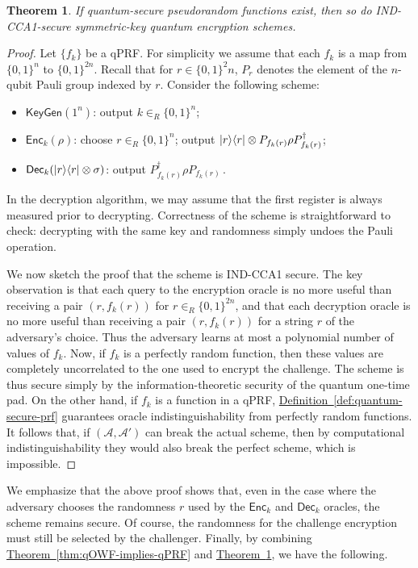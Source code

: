 \documentclass[11pt]{article}
\numberwithin{equation}{section}
\newtheorem{theorem}{Theorem}
\newcommand{\expref}[2]{\texorpdfstring{\hyperref[#2]{#1~\ref{#2}}}{#1~\ref{#2}}}
\newcommand{\algo}{\mathcal}
\newcommand{\KeyGen}{\ensuremath{\mathsf{KeyGen}}\xspace}
\newcommand{\Enc}{\ensuremath{\mathsf{Enc}}\xspace}
\newcommand{\Dec}{\ensuremath{\mathsf{Dec}}\xspace}
\newcommand{\inrand}{\in_R}
\begin{document}
{\begin{theorem}\label{thm:IND-CCA1}
If quantum-secure pseudorandom functions exist, then so do IND-CCA1-secure symmetric-key quantum encryption schemes.
\end{theorem}
\begin{proof}
Let $\{f_k\}$ be a qPRF. For simplicity we assume that each $f_k$ is a map from $\{0, 1\}^n$ to $\{0, 1\}^{2n}$. Recall that for $r \in \{0, 1\}^2n$, $P_r$ denotes the element of the $n$-qubit Pauli group indexed by $r$. Consider the following scheme:
\begin{itemize}
\item $\KeyGen(1^n)$: output $k \inrand \{0, 1\}^n$;
\item $\Enc_k(\rho)$: choose $r \inrand \{0, 1\}^n$; output ${\left\vert{r}\right\rangle}{\left\langle{r}\right\vert} \otimes P_{f_k(r)} \rho P_{f_k(r)}^{\dagger}$;
\item $\Dec_k(\ket{r}\bra{r} \otimes \sigma)$: output  $P_{f_k(r)}^\dagger \rho P_{f_k(r)}$\,.
\end{itemize}
In the decryption algorithm, we may assume that the first register is always measured prior to decrypting. Correctness of the scheme is straightforward to check: decrypting with the same key and randomness simply undoes the Pauli operation.

We now sketch the proof that the scheme is IND-CCA1 secure. The key observation is that each query to the encryption oracle is no more useful than receiving a pair $(r, f_k(r))$ for $r \inrand \{0, 1\}^{2n}$, and that each decryption oracle is no more useful than receiving a pair $(r, f_k(r))$ for a string $r$ of the adversary's choice. Thus the adversary learns at most a polynomial number of values of $f_k$. Now, if $f_k$ is a perfectly random function, then these values are completely uncorrelated to the one used to encrypt the challenge. The scheme is thus secure simply by the information-theoretic security of the quantum one-time pad. On the other hand, if $f_k$ is a function in a qPRF, \expref{Definition}{def:quantum-secure-prf} guarantees oracle indistinguishability from perfectly random functions. It follows that, if $(\algo A, \algo A')$ can break the actual scheme, then by computational indistinguishability they would also break the perfect scheme, which is impossible.
\end{proof}

We emphasize that the above proof shows that, even in the case where the adversary chooses the randomness $r$ used by the $\Enc_k$ and $\Dec_k$ oracles, the scheme remains secure. Of course, the randomness for the challenge encryption must still be selected by the challenger. Finally, by combining \expref{Theorem}{thm:qOWF-implies-qPRF} and \expref{Theorem}{thm:IND-CCA1}, we have the following.

}
\end{document}
